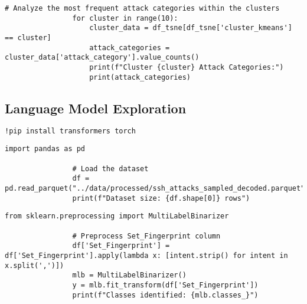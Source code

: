             \vspace{0.5em}

            \begin{lstlisting}[caption={Attack Categories Analysis by Cluster}, label={lst:attack_categories}]
                # Analyze the most frequent attack categories within the clusters
                for cluster in range(10):
                    cluster_data = df_tsne[df_tsne['cluster_kmeans'] == cluster]
                    attack_categories = cluster_data['attack_category'].value_counts()
                    print(f"Cluster {cluster} Attack Categories:")
                    print(attack_categories)
            \end{lstlisting}
            
            \vspace{0.5em}

        \subsection{Language Model Exploration}
        
            \vspace{0.5em}

            \begin{lstlisting}[language=bash, caption={Install required packages}, label={lst:install_packages}]
                !pip install transformers torch
            \end{lstlisting} 
            
            \vspace{0.5em}
            
            \begin{lstlisting}[caption={Load dataset and print its size}, label={lst:load_dataset}]
                import pandas as pd

                # Load the dataset
                df = pd.read_parquet("../data/processed/ssh_attacks_sampled_decoded.parquet")
                print(f"Dataset size: {df.shape[0]} rows")
            \end{lstlisting}
            
            \vspace{0.5em}
            
            \begin{lstlisting}[caption={Preprocess `Set\_Fingerprint` column}, label={lst:preprocess-fingerprint}]
                from sklearn.preprocessing import MultiLabelBinarizer

                # Preprocess Set_Fingerprint column
                df['Set_Fingerprint'] = df['Set_Fingerprint'].apply(lambda x: [intent.strip() for intent in x.split(',')])
                mlb = MultiLabelBinarizer()
                y = mlb.fit_transform(df['Set_Fingerprint'])
                print(f"Classes identified: {mlb.classes_}")
            \end{lstlisting}
            

